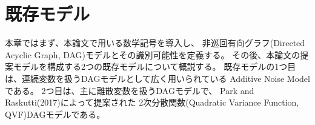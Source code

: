 
\section{既存モデル}
\label{part:model}

本章ではまず、本論文で用いる数学記号を導入し、
非巡回有向グラフ(Directed Acyclic Graph, DAG)モデルとその識別可能性を定義する。
その後、本論文の提案モデルを構成する2つの既存モデルについて概説する。
既存モデルの1つ目は、連続変数を扱うDAGモデルとして広く用いられている
Additive Noise Model
\cite{Shimizu2006-yu}
\cite{Hoyer2008-oo}
\cite{Peters2013-eb}
\cite{Peters2014-ro}
\cite{Park2020-ey}
である。
2つ目は、主に離散変数を扱うDAGモデルで、
Park and Raskutti(2017)\cite{Park2017-hw}によって提案された
2次分散関数(Quadratic Variance Function, QVF)DAGモデルである。



%

%

%

